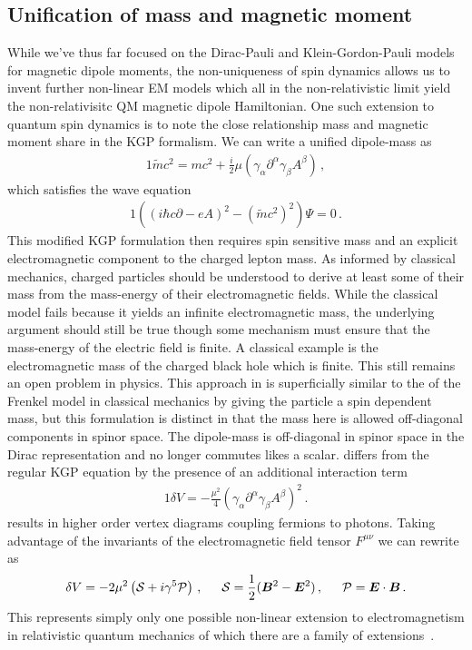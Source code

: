 \subsection{Unification of mass and magnetic moment}
\label{sec:ikgp}
While we've thus far focused on the Dirac-Pauli and Klein-Gordon-Pauli models for magnetic dipole moments, the non-uniqueness of spin dynamics allows us to invent further non-linear EM models which all in the non-relativistic limit yield the non-relativisitc QM magnetic dipole Hamiltonian. One such extension to quantum spin dynamics is to note the close relationship mass and magnetic moment share in the KGP formalism. We can write a unified dipole-mass as
\begin{alignat}{1}
    \label{eq:ext:01} \widetilde{m}c^{2}=mc^{2}+\frac{i}{2}\mu\left(\gamma_{\alpha}\partial^{\alpha}\gamma_{\beta}A^{\beta}\right)\,,
\end{alignat}
which satisfies the wave equation
\begin{alignat}{1}
    \label{eq:ext:02} \left((i\hbar c\partial-eA)^{2}-(\widetilde{m}c^{2})^{2}\right)\Psi=0\,.
\end{alignat}
This modified KGP formulation then requires spin sensitive mass and an explicit electromagnetic component to the charged lepton mass. As informed by classical mechanics, charged particles should be understood to derive at least some of their mass from the mass-energy of their electromagnetic fields. While the classical model fails because it yields an infinite electromagnetic mass, the underlying argument should still be true though some mechanism must ensure that the mass-energy of the electric field is finite. A classical example is the electromagnetic mass of the charged black hole which is finite. This still remains an open problem in physics. This approach in  is superficially similar to the of the Frenkel model in classical mechanics by giving the particle a spin dependent mass, but this formulation is distinct in that the mass here is allowed off-diagonal components in spinor space. The dipole-mass is off-diagonal in spinor space in the Dirac representation and no longer commutes likes a scalar.  differs from the regular KGP equation by the presence of an additional interaction term
\begin{alignat}{1}
    \label{eq:ext:03} \delta V=-\frac{\mu^{2}}{4}\left(\gamma_{\alpha}\partial^{\alpha}\gamma_{\beta}A^{\beta}\right)^{2}\,.
\end{alignat}
 results in higher order vertex diagrams coupling fermions to photons. Taking advantage of the invariants of the electromagnetic field tensor $F^{\mu\nu}$ we can rewrite  as
\begin{alignat}{1}
    \label{eq:ext:04a} \delta V=-2\mu^{2}\left(\mathcal{S}+i\gamma^{5}\mathcal{P}\right)\,,\indent\mathcal{S}=\frac{1}{2}(\bb{B}^{2}-\bb{E}^{2})\,,\indent \mathcal{P}=\bb{E}\cdot\bb{B}\,.
\end{alignat}
This represents simply only one possible non-linear extension to electromagnetism in relativistic quantum mechanics of which there are a family of extensions~\citep{Foldy:1952a}.

